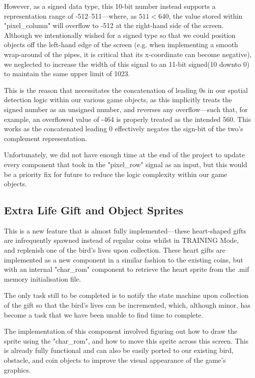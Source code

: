 \documentclass[conference]{IEEEtran}
\begin{document}
However, as a signed data type, this 10-bit number instead supports a representation range of -512–511—where, as $511<640$, the value stored within "pixel\_column" will overflow to -512 at the right-hand side of the screen. Although we intentionally wished for a signed type so that we could position objects off the left-hand edge of the screen (e.g. when implementing a smooth wrap-around of the pipes, it is critical that its x-coordinate can become negative), we neglected to increase the width of this signal to an 11-bit signed(10 downto 0) to maintain the same upper limit of 1023.

This is the reason that necessitates the concatenation of leading 0s in our spatial detection logic within our various game objects, as this implicitly treats the signed number as an unsigned number, and reverses any overflow—such that, for example, an overflowed value of -464 is properly treated as the intended 560. This works as the concatenated leading 0 effectively negates the sign-bit of the two's complement representation.

Unfortunately, we did not have enough time at the end of the project to update every component that took in the "pixel\_row" signal as an input, but this would be a priority fix for future to reduce the logic complexity within our game objects.

\subsection{Extra Life Gift and Object Sprites}
This is a new feature that is almost fully implemented—these heart-shaped gifts are infrequently spawned instead of regular coins whilst in TRAINING Mode, and replenish one of the bird's lives upon collection. These heart gifts are implemented as a new component in a similar fashion to the existing coins, but with an internal "char\_rom" component to retrieve the heart sprite from the .mif memory initialisation file.

The only task still to be completed is to notify the state machine upon collection of the gift so that the bird's lives can be incremented, which, although minor, has become a task that we have been unable to find time to complete.

The implementation of this component involved figuring out how to draw the sprite using the "char\_rom", and how to move this sprite across this screen. This is already fully functional and can also be easily ported to our existing bird, obstacle, and coin objects to improve the visual appearance of the game's graphics.
\end{document}
